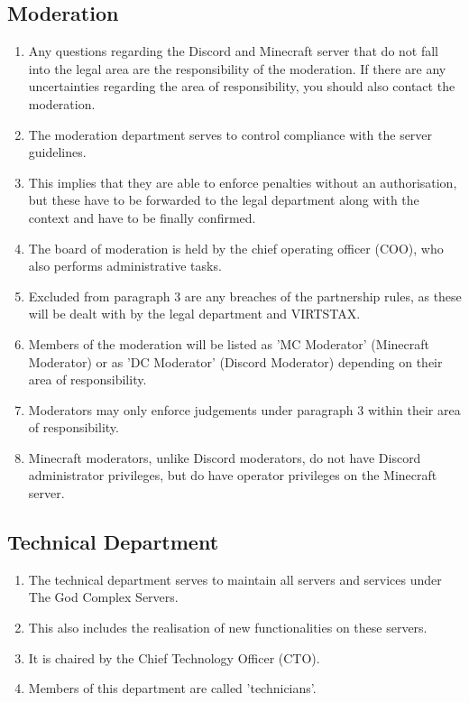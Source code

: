 \documentclass{article}
\begin{document}
\subsection{Moderation}\label{support}
\begin{enumerate}[(1)]
	\item Any questions regarding the Discord and Minecraft server that do not fall into the legal area are the responsibility of the moderation. If there are any uncertainties regarding the area of responsibility, you should also contact the moderation.
	\item The moderation department serves to control compliance with the server guidelines.
	\item This implies that they are able to enforce penalties without an authorisation, but these have to be forwarded to the legal department along with the context and have to be finally confirmed.
	\item The board of moderation is held by the chief operating officer (COO), who also performs administrative tasks.
	\item Excluded from paragraph 3 are any breaches of the partnership rules, as these will be dealt with by the legal department and VIRTSTAX.
	\item Members of the moderation will be listed as 'MC Moderator' (Minecraft Moderator) or as 'DC Moderator' (Discord Moderator) depending on their area of responsibility.
	\item Moderators may only enforce judgements under paragraph 3 within their area of responsibility.
	\item Minecraft moderators, unlike Discord moderators, do not have Discord administrator privileges, but do have operator privileges on the Minecraft server.
\end{enumerate}

\subsection{Technical Department}
\begin{enumerate}[(1)]
	\item The technical department serves to maintain all servers and services under The God Complex Servers.
	\item This also includes the realisation of new functionalities on these servers.
	\item It is chaired by the Chief Technology Officer (CTO).
	\item Members of this department are called 'technicians'.
\end{enumerate}
\end{document}

